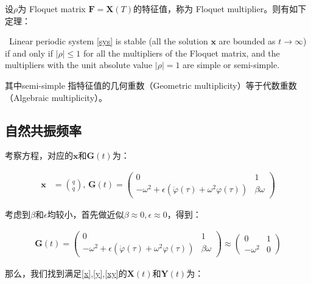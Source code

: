 设$\rho$为 Floquet matrix $\mathbf{F}=\mathbf{X}(T)$的特征值，称为 Floquet multiplier。则有如下定理：

\begin{theorem}
\label{Floquet}
\,\newline
Linear periodic system \eqref{sys} is stable (all the solution $\mathbf{x}$ are bounded as $t\rightarrow\infty$) if and only if $|\rho|\leq1$ for all the multipliers of the Floquet matrix, and the multipliers with the unit absolute value $|\rho|=1$ are simple or semi-simple. 
\end{theorem}

其中semi-simple 指特征值的几何重数（Geometric multiplicity）等于代数重数（Algebraic multiplicity）。

\subsection{自然共振频率}

考察方程，对应的$\mathbf{x}$和$\mathbf{G}(t)$为：

\begin{align}
    \mathbf{x} &= \binom{q}{\dot{q}}, \,
    \mathbf{G}(t) = 
    \begin{pmatrix}
        0 & 1 \\ 
        -\omega^{2}+\epsilon\left(\ddot{\varphi}(\tau)+\omega^{2}\varphi(\tau)\right) & \beta\omega
    \end{pmatrix}
\end{align}

考虑到$\beta$和$\epsilon$均较小，首先做近似$\beta\approx0,\epsilon\approx0$，得到：

\begin{align}
    \mathbf{G}(t) = 
    \begin{pmatrix}
        0 & 1 \\ 
        -\omega^{2}+\epsilon\left(\ddot{\varphi}(\tau)+\omega^{2}\varphi(\tau)\right) & \beta\omega
    \end{pmatrix}\approx
    \begin{pmatrix}
        0 & 1 \\ 
        -\omega^{2} & 0
    \end{pmatrix}
\end{align}

那么，我们找到满足\eqref{x},\eqref{y},\eqref{xy}的$\mathbf{X}(t)$和$\mathbf{Y}(t)$为：

